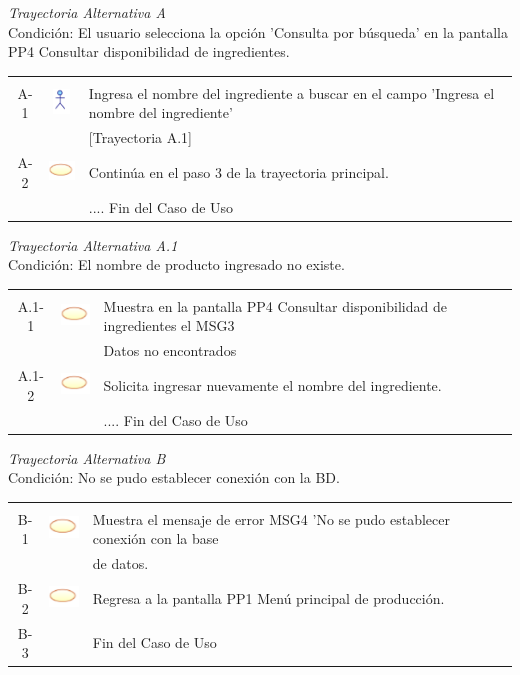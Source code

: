 \documentclass[10pt,spanish]{article}
\providecommand{\tabularnewline}{\\}
\begin{document}
	\textit{Trayectoria Alternativa A}\\
	Condición: El usuario selecciona la opción 'Consulta por búsqueda' en la pantalla PP4 Consultar disponibilidad de ingredientes.\\
	\begin{tabular}{ccl}
	& & \tabularnewline
	A-1 & \includegraphics{actor} & Ingresa el nombre del ingrediente a buscar en el campo 'Ingresa el nombre del ingrediente'\tabularnewline
	& & [Trayectoria A.1]\tabularnewline
	A-2 & \includegraphics{sistema} & Continúa en el paso 3 de la trayectoria principal.\tabularnewline	
	 & & .... Fin del Caso de Uso\tabularnewline
	\end{tabular}
	
	\textit{Trayectoria Alternativa A.1}\\
	Condición: El nombre de producto ingresado no existe.\\
	\begin{tabular}{ccl}
	& & \tabularnewline
	A.1-1 & \includegraphics{sistema} & Muestra en la pantalla PP4 Consultar disponibilidad de ingredientes el MSG3\tabularnewline
	& &  Datos no encontrados\tabularnewline 
	A.1-2 & \includegraphics{sistema} & Solicita ingresar nuevamente el nombre del ingrediente.\tabularnewline	
	 & & .... Fin del Caso de Uso\tabularnewline
	\end{tabular}
	
	\textit{Trayectoria Alternativa B}\\
	Condición: No se pudo establecer conexión con la BD.\\
	\begin{tabular}{ccl}
	& & \tabularnewline
	B-1 & \includegraphics{sistema} & Muestra el mensaje de error MSG4 'No se pudo establecer conexión con la base\tabularnewline
	& & de datos.\tabularnewline
	B-2 & \includegraphics{sistema} & Regresa a la pantalla PP1 Menú principal de producción.\tabularnewline
	B-3 & & Fin del Caso de Uso\tabularnewline	
	\end{tabular}
	
\end{document}

